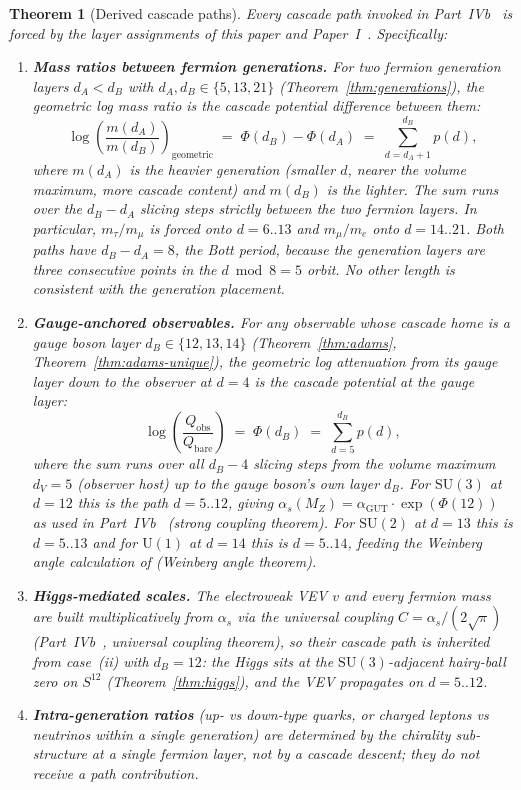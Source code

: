\documentclass[12pt,a4paper]{article}
\newtheorem{theorem}{Theorem}[section]
\begin{document}
\begin{theorem}[Derived cascade paths]\label{thm:forced-paths}
Every cascade path invoked in Part~IVb~\cite{part4b} is forced by the layer assignments of this paper and Paper~I~\cite{part0}. Specifically:
\begin{enumerate}
\item[(i)] \textbf{Mass ratios between fermion generations.} For two fermion generation layers $d_A<d_B$ with $d_A,d_B\in\{5,13,21\}$ (Theorem~\ref{thm:generations}), the geometric log mass ratio is the cascade potential difference between them:
\[
\log\!\left(\frac{m(d_A)}{m(d_B)}\right)_{\text{geometric}} \;=\; \Phi(d_B)-\Phi(d_A) \;=\; \sum_{d=d_A+1}^{d_B} p(d),
\]
where $m(d_A)$ is the heavier generation (smaller $d$, nearer the volume maximum, more cascade content) and $m(d_B)$ is the lighter. The sum runs over the $d_B-d_A$ slicing steps strictly between the two fermion layers. In particular, $m_\tau/m_\mu$ is forced onto $d=6..13$ and $m_\mu/m_e$ onto $d=14..21$. Both paths have $d_B-d_A=8$, the Bott period, because the generation layers are three consecutive points in the $d\bmod 8 = 5$ orbit. No other length is consistent with the generation placement.

\item[(ii)] \textbf{Gauge-anchored observables.} For any observable whose cascade home is a gauge boson layer $d_B\in\{12,13,14\}$ (Theorem~\ref{thm:adams}, Theorem~\ref{thm:adams-unique}), the geometric log attenuation from its gauge layer down to the observer at $d=4$ is the cascade potential at the gauge layer:
\[
\log\!\left(\frac{Q_{\text{obs}}}{Q_{\text{bare}}}\right) \;=\; \Phi(d_B) \;=\; \sum_{d=5}^{d_B} p(d),
\]
where the sum runs over all $d_B-4$ slicing steps from the volume maximum $d_V=5$ (observer host) up to the gauge boson's own layer $d_B$. For $\mathrm{SU}(3)$ at $d=12$ this is the path $d=5..12$, giving $\alpha_s(M_Z) = \alpha_{\mathrm{GUT}}\cdot\exp(\Phi(12))$ as used in Part~IVb~\cite{part4b} (strong coupling theorem). For $\mathrm{SU}(2)$ at $d=13$ this is $d=5..13$ and for $\mathrm{U}(1)$ at $d=14$ this is $d=5..14$, feeding the Weinberg angle calculation of \cite{part4b} (Weinberg angle theorem).

\item[(iii)] \textbf{Higgs-mediated scales.} The electroweak VEV $v$ and every fermion mass are built multiplicatively from $\alpha_s$ via the universal coupling $C=\alpha_s/(2\sqrt{\pi})$ (Part~IVb~\cite{part4b}, universal coupling theorem), so their cascade path is inherited from case~(ii) with $d_B=12$: the Higgs sits at the $\mathrm{SU}(3)$-adjacent hairy-ball zero on $S^{12}$ (Theorem~\ref{thm:higgs}), and the VEV propagates on $d=5..12$.

\item[(iv)] \textbf{Intra-generation ratios} (up- vs down-type quarks, or charged leptons vs neutrinos within a single generation) are determined by the chirality sub-structure at a single fermion layer, not by a cascade descent; they do not receive a path contribution.
\end{enumerate}
\end{theorem}
\end{document}
